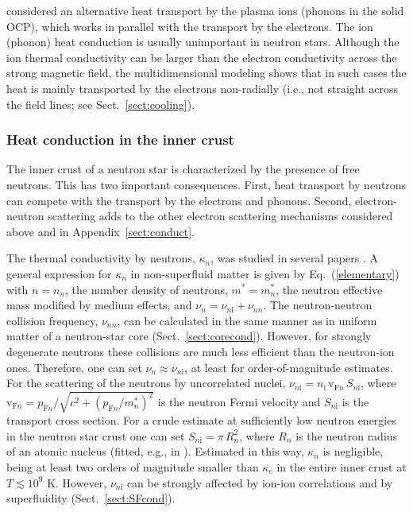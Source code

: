 \documentclass[smallextended]{svjour3}       %
\newcommand{\pFn}{p_{\mathrm{F}n}}
\newcommand{\req}[1]{Eq.~(\ref{#1})}
\begin{document}
\citet{ChugunovHaensel07} considered an alternative heat
transport by the plasma ions (phonons in the solid OCP),
which works in parallel with the transport by the electrons.
The ion (phonon) heat conduction is usually unimportant in neutron stars.
Although the ion thermal conductivity can be larger than the
electron conductivity across the strong magnetic field, the
multidimensional modeling shows
that in such cases the heat is mainly transported by the
electrons non-radially (i.e., not straight across the field
lines; see Sect.~\ref{sect:cooling}).

\subsubsection{Heat conduction in the inner crust}

The inner crust of a neutron star is characterized by the
presence of free neutrons. This has two important
consequences. First, heat transport by neutrons can compete
with the transport by the electrons and phonons. Second,
electron-neutron scattering adds to the other electron
scattering mechanisms considered above and in
Appendix~\ref{sect:conduct}.

The thermal conductivity by neutrons, $\kappa_n$, was
studied in several papers
\citep[e.g.,][]{FlowersItoh76,BisnoRomanova82}. A general
expression for $\kappa_n$ in non-superfluid matter is given
by \req{elementary} with $n=n_n$, the number density of
neutrons, $m^*=m_n^\ast$, the neutron effective mass
modified by medium effects, and $\nu_n=\nu_{n\mathrm{i}}+\nu_{nn}$.
The neutron-neutron collision frequency, $\nu_{nn}$, can be
calculated in the same manner as in uniform matter of a
neutron-star core (Sect.~\ref{sect:corecond}). However, for
strongly degenerate neutrons these collisions are much less
efficient than the neutron-ion ones. Therefore, one can set
$\nu_n \approx \nu_{n\mathrm{i}}$, at least for order-of-magnitude
estimates. For the scattering of the neutrons by
uncorrelated nuclei,  $\nu_{n\mathrm{i}} = n_\mathrm{i} \,
\mathrm{v}_{\mathrm{F}n} \, S_{n\mathrm{i}}$, where
$\mathrm{v}_{\mathrm{F}n}=\pFn/
\sqrt{c^2+(\pFn/m_n^\ast)^2}$  is the neutron Fermi velocity
and $S_{n\mathrm{i}}$ is the transport cross section. For a
crude estimate at sufficiently low neutron energies in the
neutron star crust one can set
\citep[e.g.,][]{BisnoRomanova82} $S_{n\mathrm{i}}= \pi \,
R_n^2$, where $R_n$ is the neutron radius of an atomic
nucleus (fitted, e.g., in \citealp{Potekhin-ea13}).
Estimated in this way, $\kappa_n$ is negligible, being at
least two orders of magnitude smaller than $\kappa_e$ in the
entire inner crust at $T \lesssim 10^9$ K. However,
$\nu_{n\mathrm{i}}$ can be strongly affected by ion-ion
correlations and by superfluidity (Sect.~\ref{sect:SFcond}).
\end{document}
